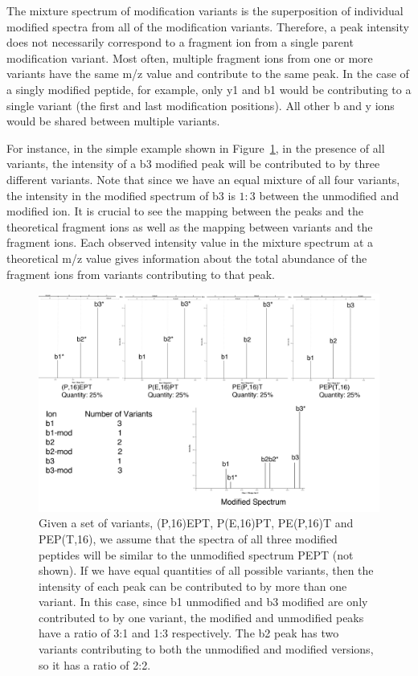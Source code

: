 The mixture spectrum of modification variants is the superposition of individual modified spectra from all of the modification variants. Therefore, a peak intensity does not necessarily correspond to a fragment ion from a single parent modification variant. Most often, multiple fragment ions from one or more variants have the same m/z value and contribute to the same peak. In the case of a singly modified peptide, for example, only y1 and b1 would be contributing to a single variant (the first and last modification positions). All other b and y ions would be shared between multiple variants.

For instance, in the simple example shown in Figure~\ref{fig:3by5example}, in the presence of all variants, the intensity of a b3 modified peak will be contributed to by three different variants. Note that since we have an equal mixture of all four variants, the intensity in the modified spectrum of b3 is $1:3$ between the unmodified and modified ion. It is crucial to see the mapping between the peaks and the theoretical fragment ions as well as the mapping between variants and the fragment ions. Each observed intensity value in the mixture spectrum at a theoretical m/z value gives information about the total abundance of the fragment ions from variants contributing to that peak.

\begin{figure}[htbp!]
\centering
\includegraphics[]{PEPT_all.png}
\caption{Given a set of variants, (P,16)EPT, P(E,16)PT, PE(P,16)T and PEP(T,16), we assume that the spectra of all three modified peptides will be similar to the unmodified spectrum PEPT (not shown). If we have equal quantities of all possible variants, then the intensity of each peak can be contributed to by more than one variant. In this case, since b1 unmodified and b3 modified are only contributed to by one variant, the modified and unmodified peaks have a ratio of 3:1 and 1:3 respectively. The b2 peak has two variants contributing to both the unmodified and modified versions, so it has a ratio of 2:2.}
\label{fig:3by5example}
\end{figure}